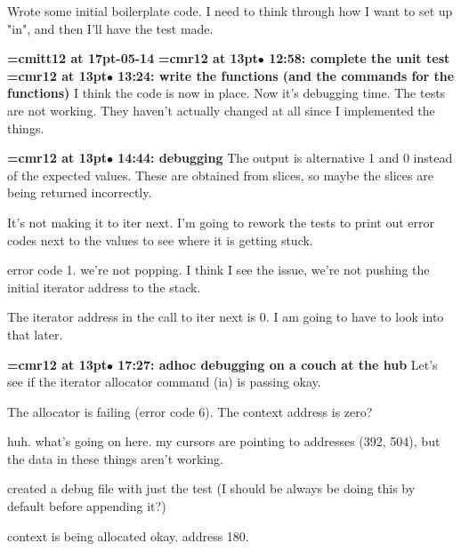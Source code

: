 Wrote some initial boilerplate code. I need to think through how I want to set up "in", and then I'll have the test made.
\par

{\medskip\noindent\bf\font\titlefont=cmitt12 at 17pt-05-14}\medskip
{\smallskip\noindent\bf\font\titlefont=cmr12 at 13pt\titlefont $\bullet$ 12:58: complete the unit test}\smallskip
{\smallskip\noindent\bf\font\titlefont=cmr12 at 13pt\titlefont $\bullet$ 13:24: write the functions (and the commands for the functions)}\smallskip
I think the code is now in place. Now it's debugging time. The tests are not working. They haven't actually changed at all since I implemented the things.
\par

{\smallskip\noindent\bf\font\titlefont=cmr12 at 13pt\titlefont $\bullet$ 14:44: debugging}\smallskip
The output is alternative 1 and 0 instead of the expected values. These are obtained from slices, so maybe the slices are being returned incorrectly.
\par

It's not making it to iter next. I'm going to rework the tests to print out error codes next to the values to see where it is getting stuck.
\par

error code 1. we're not popping. I think I see the issue, we're not pushing the initial iterator address to the stack.
\par

The iterator address in the call to iter next is 0. I am going to have to look into that later.
\par

{\smallskip\noindent\bf\font\titlefont=cmr12 at 13pt\titlefont $\bullet$ 17:27: adhoc debugging on a couch at the hub}\smallskip
Let's see if the iterator allocator command (ia) is passing okay.
\par

The allocator is failing (error code 6). The context address is zero?
\par

huh. what's going on here. my cursors are pointing to addresses (392, 504), but the data in these things aren't working.
\par

created a debug file with just the test (I should be always be doing this by default before appending it?) 
\par

context is being allocated okay. address 180.
\par

